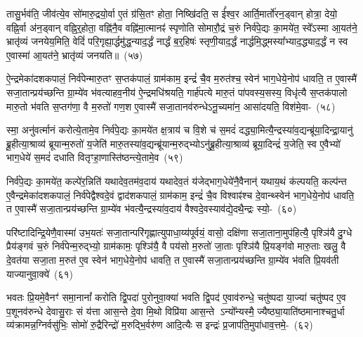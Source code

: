 तासु॒र्भव॑ति॒ जीव॑त्ये॒व सो॑मारु॒द्रयो॒र्वा ए॒तं ग्र॑सि॒तꣳ होता॒ निष्खि॑दति॒ स ई᳚श्व॒र आर्ति॒मार्तो॑रन॒ड्वान् होत्रा॒ देयो॒ वह्नि॒र्वा अ॑न॒ड्वान् वह्नि॒र्॒\mbox{}होता॒ वह्नि॑नै॒व वह्नि॑मा॒त्मानꣴ॑ स्पृणोति सोमारौ॒द्रं च॒रुं निर्व॑पे॒द्यः का॒मये॑त॒ स्वे᳚\-ऽस्मा आ॒यत॑ने॒ भ्रातृ॑व्यं जनयेय॒मिति॒ वेदिं॑ परि॒गृह्या॒र्द्धमु॑द्ध॒न्याद॒र्द्धं नार्द्धं ब॒र्॒\mbox{}हिषः॑ स्तृणी॒याद॒र्द्धं नार्द्धमि॒द्ध्मस्या᳚भ्याद॒द्ध्याद॒र्द्धं न स्व ए॒वास्मा॑ आ॒यत॑ने॒ भ्रातृ॑व्यं जनयति॥~(५७)

{\anuvakamend[{रु॒द्रो भे॑ष॒जं वि॒न्दते॒ यदि॑ स्तृणी॒याद॒र्द्धं द्वाद॑श च}]}

ऐ॒न्द्रमेका॑\-दश\-कपालं॒ निर्व॑पेन्मारु॒तꣳ स॒प्तक॑पालं॒ ग्राम॑काम॒ इन्द्रं॑ चै॒व म॒रुत॑श्च॒ स्वेन॑ भाग॒धेये॒नोप॑ धावति॒ त ए॒वास्मै॑ सजा॒तान्प्रय॑च्छन्ति ग्रा॒म्ये॑व भ॑वत्याहव॒नीय॑ ऐ॒न्द्रमधि॑श्रयति॒ गार्\mbox{}ह॑पत्ये मारु॒तं पा॑पवस्य॒सस्य॒ विधृ॑त्यै स॒प्तक॑पालो मारु॒तो भ॑वति स॒प्तग॑णा॒ वै म॒रुतो॑ गण॒श ए॒वास्मै॑ सजा॒तानव॑\-रुन्धे\-ऽनू॒च्यमा॑न॒ आसा॑दयति॒ विश॑मे॒वा-~(५८)

स्मा॒ अनु॑वर्त्मानं करोत्ये॒तामे॒व निर्व॑पे॒द्यः का॒मये॑त क्ष॒त्राय॑ च वि॒शे च॑ स॒मदं॑ दद्ध्या॒मित्यै॒न्द्रस्या॑व॒द्यन्ब्रू॑या॒दिन्द्रा॒यानु॑ ब्रू॒हीत्या॒श्राव्य॑ ब्रूयान्म॒रुतो॑ य॒जेति॑ मारु॒तस्या॑व॒द्यन्ब्रू॑यान्म॒रुद्भ्यो\-ऽनु॑ब्रू॒हीत्या॒श्राव्य॑ ब्रूया॒दिन्द्रं॑ य॒जेति॒ स्व ए॒वैभ्यो॑ भाग॒धेये॑ स॒मदं॑ दधाति वितृꣳहा॒णास्ति॑ष्ठन्त्ये॒तामे॒व~(५९)

निर्व॑पे॒द्यः का॒मये॑त॒ कल्पे॑र॒न्निति॑ यथादेव॒तम॑व॒दाय॑ यथादेव॒तं य॑जेद्भाग॒धेये॑नै॒वैनान्॑ यथाय॒थं क॑ल्पयति॒ कल्प॑न्त ए॒वैन्द्रमेका॑\-दश\-कपालं॒ निर्व॑पेद्वैश्वदे॒वं द्वाद॑श\-कपालं॒ ग्राम॑काम॒ इन्द्रं॑ चै॒व विश्वाꣴ॑श्च दे॒वान्थ्स्वेन॑ भाग॒धेये॒नोप॑ धावति॒ त ए॒वास्मै॑ सजा॒तान्प्रय॑च्छन्ति ग्रा॒म्ये॑व भ॑वत्यै॒न्द्रस्या॑व॒दाय॑ वैश्वदे॒वस्याव॑द्ये॒दथै॒न्द्रः स्यो॒-~(६०)

परि॑ष्टादिन्द्रि॒येणै॒वास्मा॑ उभ॒यतः॑ सजा॒तान्परि॑\-गृह्णात्युपाधा॒य्य॑\-पूर्वयं॒ वासो॒ दक्षि॑णा सजा॒ताना॒मुप॑हित्यै॒ पृश्ञि॑यै दु॒ग्धे प्रैय॑ङ्गवं च॒रुं निर्व॑पेन्म॒रुद्भ्यो॒ ग्राम॑कामः॒ पृश्ञि॑यै॒ वै पय॑सो म॒रुतो॑ जा॒ताः पृश्ञि॑यै प्रि॒यङ्ग॑वो मारु॒ताः खलु॒ वै दे॒वत॑या सजा॒ता म॒रुत॑ ए॒व स्वेन॑ भाग॒धेये॒नोप॑ धावति॒ त ए॒वास्मै॑ सजा॒तान्प्रय॑च्छन्ति ग्रा॒म्ये॑व भ॑वति प्रि॒यव॑ती याज्यानुवा॒क्ये॑~(६१)

भवतः प्रि॒यमे॒वैनꣳ॑ समा॒नानां᳚ करोति द्वि॒पदा॑ पुरोनुवा॒क्या॑ भवति द्वि॒पद॑ ए॒वाव॑\-रुन्धे॒ चतु॑ष्पदा या॒ज्या॑ चतु॑ष्पद ए॒व प॒शूनव॑\-रुन्धे देवासु॒राः सं य॑त्ता आस॒न्ते दे॒वा मि॒थो विप्रि॑या आस॒न्ते \-ऽन्यो᳚न्यस्मै॒ ज्यैष्ठ्या॒याति॑ष्ठमानाश्चतु॒र्धा व्य॑क्रामन्न॒ग्निर्वसु॑भिः॒ सोमो॑ रु॒द्रैरिन्द्रो॑ म॒रुद्भि॒र्वरु॑ण आदि॒त्यैः स इन्द्रः॑ प्र॒जा\-प॑ति॒मुपा॑धाव॒त्तमे॒-~(६२)

